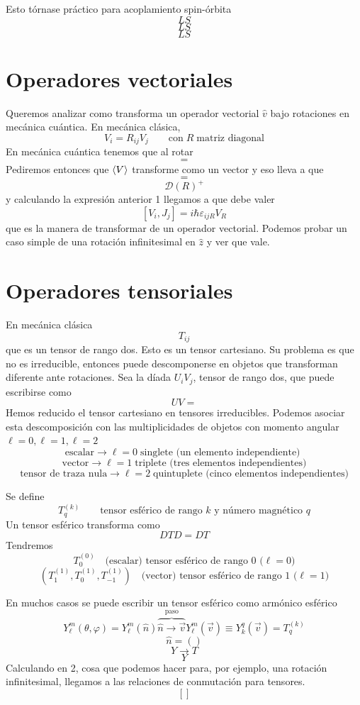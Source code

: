 \documentclass[10pt,oneside]{CBFT_book}
\begin{document}
Esto tórnase práctico para acoplamiento spin-órbita 
\[
	LS
\]
\[
	LS
\]
\[
	LS
\]

\section{Operadores vectoriales}

Queremos analizar como transforma un operador vectorial $\hat{v}$ bajo rotaciones en mecánica cuántica.
En mecánica clásica,
\[
	V_i = R_{ij} V_j \qquad \text{con} \; R \; \text{matriz diagonal}
\]
En mecánica cuántica tenemos que al rotar
\[
	=
\]
Pediremos entonces que $\Braket{V}$ transforme como un vector y eso lleva a que 
\[
	=
\]
\[
	\mathcal{D}(R)^+
\]
y calculando la expresión anterior 1 llegamos a que debe valer
\[
	[V_i,J_j] =  i\hbar \varepsilon_{ijR}V_R
\]
que es la manera de transformar de un operador vectorial. Podemos probar un caso simple de una rotación 
infinitesimal 
en $\hat{z}$ y ver que vale.


\section{Operadores tensoriales}

En mecánica clásica 
\[
	T_{ij} 
\]
que es un tensor de rango dos. Esto es un tensor cartesiano. Su problema es que no es irreducible, entonces 
puede 
descomponerse en objetos que transforman diferente ante rotaciones. Sea la díada $U_iV_j$, tensor de rango 
dos, que 
puede escribirse como 
\[
	UV =
\]
Hemos reducido el tensor cartesiano en tensores irreducibles. Podemos asociar esta descomposición con las 
multiplicidades de objetos con momento angular $\ell=0, \ell=1, \ell=2$
\[
	\text{escalar} \longrightarrow \ell=0 \; \text{singlete (un elemento independiente) }
\]
\[
	\text{vector} \longrightarrow \ell=1 \; \text{triplete (tres elementos independientes)}
\]
\[
	\text{tensor de traza nula} \longrightarrow \ell=2 \; \text{quintuplete (cinco elementos 
independientes)}
\]

Se define 
\[
	T^{(k)}_q \qquad \text{tensor esférico de rango $k$ y número magnético $q$}
\]
Un tensor esférico transforma como 
\[
	D T D = D T 
\]
Tendremos 
\[
	T^{(0)}_0 \quad \text{(escalar) tensor esférico de rango 0 ($\ell=0$)}
\]
\[
	(T^{(1)}_1,T^{(1)}_0,T^{(1)}_{-1}) \quad \text{(vector) tensor esférico de rango 1 ($\ell=1$)}
\]

En muchos casos se puede escribir un tensor esférico como armónico esférico 
\[
	Y_\ell^{m}(\theta,\varphi) = Y_\ell^{m}(\hat{n})  \overbrace{\hat{n} \longrightarrow 
	\vec{v}}^{\text{paso}} Y_\ell^m(\vec{v}) \equiv Y_k^q(\vec{v}) = T_q^{(k)}
\]
\[
	\hat{n} = ()
\]
\[
	Y \longrightarrow T
\]
\[
	Y
\]
Calculando en 2, cosa que podemos hacer para, por ejemplo, una rotación infinitesimal, llegamos a las 
relaciones de conmutación para tensores.
\[
	[]
\]



\end{document}
